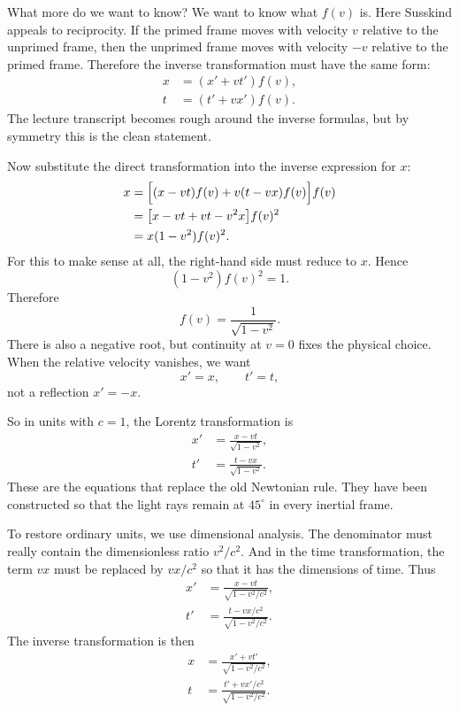 What more do we want to know? We want to know what \(f(v)\) is. Here Susskind appeals to reciprocity. If the primed frame moves with velocity \(v\) relative to the unprimed frame, then the unprimed frame moves with velocity \(-v\) relative to the primed frame. Therefore the inverse transformation must have the same form:
\begin{align}
x&=(x'+vt')f(v),\\
t&=(t'+vx')f(v).
\end{align}
The lecture transcript becomes rough around the inverse formulas, but by symmetry this is the clean statement.

Now substitute the direct transformation into the inverse expression for \(x\):
\begin{align}
x&=\Bigl[(x-vt)f(v)+v(t-vx)f(v)\Bigr]f(v)\\
 &=\bigl[x-vt+vt-v^2x\bigr]f(v)^2\\
 &=x(1-v^2)f(v)^2.
\end{align}
For this to make sense at all, the right-hand side must reduce to \(x\). Hence
\begin{equation}
(1-v^2)f(v)^2=1.
\end{equation}
Therefore
\begin{equation}
f(v)=\frac{1}{\sqrt{1-v^2}}.
\end{equation}
There is also a negative root, but continuity at \(v=0\) fixes the physical choice. When the relative velocity vanishes, we want
\[
x'=x,\qquad t'=t,
\]
not a reflection \(x'=-x\).

So in units with \(c=1\), the Lorentz transformation is
\begin{align}
x'&=\frac{x-vt}{\sqrt{1-v^2}},\\
t'&=\frac{t-vx}{\sqrt{1-v^2}}.
\end{align}
These are the equations that replace the old Newtonian rule. They have been constructed so that the light rays remain at \(45^\circ\) in every inertial frame.

To restore ordinary units, we use dimensional analysis. The denominator must really contain the dimensionless ratio \(v^2/c^2\). And in the time transformation, the term \(vx\) must be replaced by \(vx/c^2\) so that it has the dimensions of time. Thus
\begin{align}
x'&=\frac{x-vt}{\sqrt{1-v^2/c^2}},\\
t'&=\frac{t-vx/c^2}{\sqrt{1-v^2/c^2}}.
\end{align}
The inverse transformation is then
\begin{align}
x&=\frac{x'+vt'}{\sqrt{1-v^2/c^2}},\\
t&=\frac{t'+vx'/c^2}{\sqrt{1-v^2/c^2}}.
\end{align}

